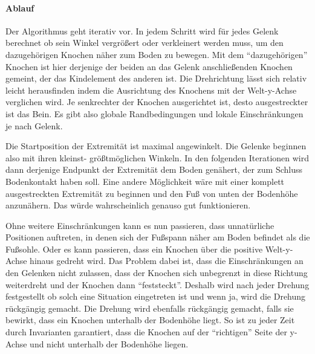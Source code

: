 \paragraph{Ablauf}
Der Algorithmus geht iterativ vor.
In jedem Schritt wird für jedes Gelenk berechnet ob sein Winkel vergrößert oder verkleinert werden muss, um den dazugehörigen Knochen näher zum Boden zu bewegen.
Mit dem "`dazugehörigen"' Knochen ist hier derjenige der beiden an das Gelenk anschließenden Knochen gemeint, der das Kindelement des anderen ist.
Die Drehrichtung lässt sich relativ leicht herausfinden indem die Ausrichtung des Knochens mit der Welt-y-Achse verglichen wird. Je senkrechter der Knochen ausgerichtet ist, desto ausgestreckter ist das Bein.
Es gibt also globale Randbedingungen und lokale Einschränkungen je nach Gelenk. %

Die Startposition der Extremität ist maximal angewinkelt. Die Gelenke beginnen also mit ihren kleinst- \bzw größtmöglichen Winkeln. In den folgenden Iterationen wird dann derjenige Endpunkt der Extremität dem Boden genähert, der zum Schluss Bodenkontakt haben soll. 
Eine andere Möglichkeit wäre mit einer komplett ausgestreckten Extremität zu beginnen und den Fuß von unten der Bodenhöhe anzunähern. Das würde wahrscheinlich genauso gut funktionieren.

Ohne weitere Einschränkungen kann es nun passieren, dass unnatürliche Positionen auftreten, in denen sich \zb der Fußspann näher am Boden befindet als die Fußsohle.
Oder es kann passieren, dass ein Knochen über die positive Welt-y-Achse hinaus gedreht wird. Das Problem dabei ist, dass die Einschränkungen an den Gelenken nicht zulassen, dass der Knochen sich unbegrenzt in diese Richtung weiterdreht und der Knochen dann "`feststeckt"'. Deshalb wird nach jeder Drehung festgestellt ob solch eine Situation eingetreten ist und wenn ja, wird die Drehung rückgängig gemacht.
Die Drehung wird ebenfalls rückgängig gemacht, falls sie bewirkt, dass ein Knochen unterhalb der Bodenhöhe liegt.
So ist zu jeder Zeit durch Invarianten garantiert, dass die Knochen auf der "`richtigen"' Seite der y-Achse und nicht unterhalb der Bodenhöhe liegen.

